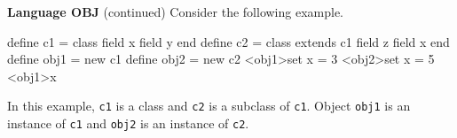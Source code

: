 \begin{minipage}[t]{\sw}
\slidenumber
\LARGE
{\bf Language OBJ} (continued)\exx
Consider the following example.
\begin{qv}
define c1 =
  class %
    field x
    field y
  end
define c2 = 
  class extends c1
    field z
    field x
  end
define obj1 = new c1
define obj2 = new c2
<obj1>set x = 3
<obj2>set x = 5
<obj1>x %
\end{qv}
In this example, \verb'c1' is a class
and \verb'c2' is a subclass of \verb'c1'.
Object \verb'obj1' is an instance of \verb'c1'
and \verb'obj2' is an instance of \verb'c2'.  
\end{minipage}
